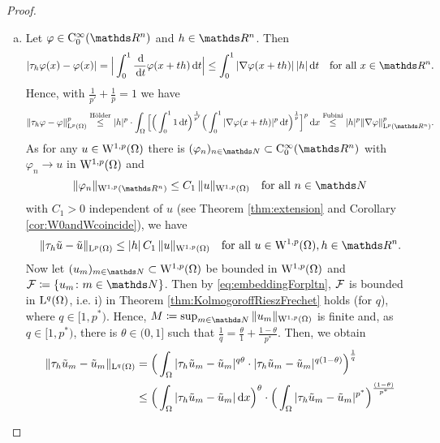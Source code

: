 \begin{proof}
  \begin{enumerate}[a)]
    \item Let $\varphi \in \CC_0^\infty(\R^n)$ and $h \in \R^n$.
      Then
      $$
      |\tau_h \varphi(x) - \varphi(x)|
      = \Big|\int_0^1 \frac{\d{}}{\d t} \varphi(x + th) \d t \Big|
      \leq \int_0^1 |\nabla\varphi(x + th)| \, |h| \d t \quad\text{for all } x \in \R^n.
      $$
      Hence, with $\frac{1}{p'} + \frac{1}{p} = 1$ we have
      $$
      \|\tau_h \varphi - \varphi \|_{\Ell^p(\Omega)}^p 
      \overset{\text{Hölder}}{\leq} |h|^p \cdot \int_\Omega \Big[ \Big( \int_0^1 1 \d t \Big)^{\frac{1}{p'}} \Big( \int_0^1 |\nabla\varphi(x + th)|^p \d t \Big)^{\frac{1}{p}} \Big]^p \d x
      \overset{\text{Fubini}}{\leq} |h|^p \|\nabla\varphi\|_{\Ell^p(\R^n)}^p.
      $$
      As for any $u \in \mathrm{W}^{1,p}(\Omega)$ there is $(\varphi_n)_{n \in \N} \subset \CC_0^\infty(\R^n)$ with $\varphi_n \to u$ in $\mathrm{W}^{1,p}(\Omega)$ and
      $$
      \|\varphi_n\|_{\WW^{1,p}(\R^n)} \leq C_1 \, \|u\|_{\WW^{1,p}(\Omega)} \quad\text{for all } n \in \N
      $$
      with $C_1 > 0$ independent of $u$ (see Theorem \ref{thm:extension} and Corollary \ref{cor:W0andWcoincide}), we have
      \begin{equation}
        \label{eq:translationEstimate}
        \|\tau_h \tilde u - \tilde u\|_{\Ell^p(\Omega)} \leq |h| \, C_1 \, \|u\|_{\WW^{1,p}(\Omega)} \quad\text{for all } u \in \WW^{1,p}(\Omega), h \in \R^n.
      \end{equation}
      Now let $(u_m)_{m \in \N} \subset \WW^{1,p}(\Omega)$ be bounded in $\mathrm{W}^{1,p}(\Omega)$ and $\FF \coloneqq \{ u_m \colon m \in \N\}$.
      Then by \eqref{eq:embeddingForpltn}, $\mathcal{F}$ is bounded in $\mathrm{L}^q(\Omega)$, i.e. i) in Theorem \ref{thm:KolmogoroffRieszFrechet} holds (for $q$), where $q \in [1,p^*)$.
        Hence, $M \coloneqq \sup_{m \in \N} \|u_m\|_{\WW^{1,p}(\Omega)}$ is finite and, as $q \in [1,p^*)$, there is $\theta \in (0,1]$ such that $\frac{1}{q} = \frac{\theta}{1} + \frac{1 - \theta}{p^*}$.
        Then, we obtain
        \begin{align*}
        \|\tau_h \tilde u_m - \tilde u_m \|_{\Ell^q(\Omega)}
        &= \Big( \int_\Omega |\tau_h \tilde u_m - \tilde u_m |^{q\theta}\cdot |\tau_h \tilde u_m - \tilde u_m |^{q(1 - \theta)} \Big)^{\frac{1}{q}} \\
        &\leq \Big( \int_\Omega |\tau_h \tilde u_m - \tilde u_m |\d x \Big)^\theta \cdot \Big( \int_\Omega |\tau_h \tilde u_m - \tilde u_m |^{p^*} \Big)^{\frac{(1 - \theta)}{p^*}}

\end{align*}
\end{enumerate}
\end{proof}
